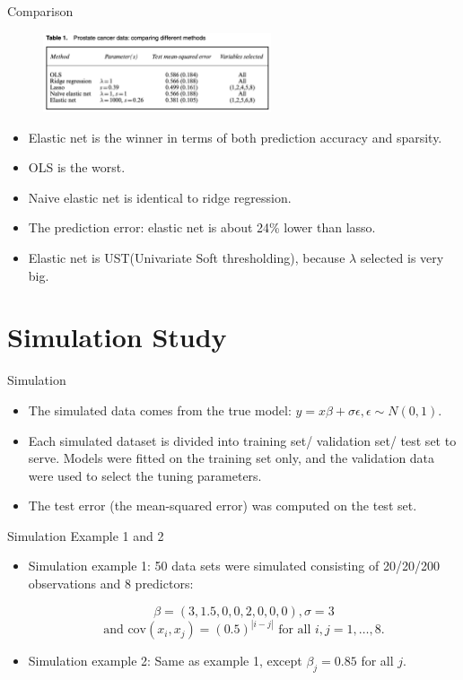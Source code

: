     \begin{frame}{Comparison}
        \begin{figure}
            \centering
            \includegraphics[width=0.6\textwidth]{img/Table 1.png}
        \end{figure}
        \begin{itemize}
            \item Elastic net is the winner in terms of both prediction accuracy and sparsity.
            \item OLS is the worst.
            \item Naive elastic net is identical to ridge regression.
            \item The prediction error: elastic net is about 24\% lower than lasso.
            \item Elastic net is UST(Univariate Soft thresholding), because $\lambda$ selected is very big.
        \end{itemize}
    \end{frame}
\section{Simulation Study}
    
    \begin{frame}{Simulation}
    \begin{itemize}
        \item The simulated data comes from the true model: $y=x\beta+\sigma\epsilon,\epsilon\sim N(0,1).$ 
        \item Each simulated dataset is divided into training set/ validation set/ test set to serve. Models were fitted on the training set only, and the validation data were used to select the tuning parameters.
        \item The test error (the mean-squared error) was computed on the test set.

    \end{itemize}
    \end{frame}

    \begin{frame}{Simulation Example 1 and 2}
    \begin{itemize}
        \item Simulation example 1: 50 data sets were simulated consisting of 20/20/200 observations and 8 predictors:

$$
\beta=(3,1.5,0,0,2,0,0,0), \sigma=3
$$
$$
 \text{and cov}( x_i, x_j) = ( 0.5)^{|i- j|} \text{ for all } i,j=1,\dots,8.
$$
        \item Simulation example 2: Same as example 1, except $\beta_j=0.85$ for all $j.$
    \end{itemize}
    \end{frame}

